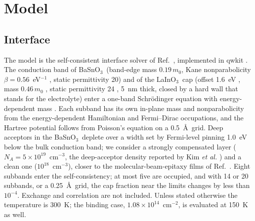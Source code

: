 \documentclass[11pt]{article}
\newcommand{\LIO}{\texorpdfstring{LaInO$_3$}{LaInO3}}
\newcommand{\BSO}{\texorpdfstring{BaSnO$_3$}{BaSnO3}}
\begin{document}
\section{Model}
\subsection{Interface}
The model is the self-consistent interface solver of Ref.~\cite{OwnbyMAT01}, implemented in qwkit \cite{qwkit}. The conduction band of \BSO\ (band-edge mass $0.19\,m_0$, Kane nonparabolicity $\beta=0.56$~eV$^{-1}$ \cite{Niedermeier2017}, static permittivity 20) and of the \LIO\ cap (offset 1.6~eV \cite{Kim2019LIO,Lee2024LIO,Aggoune2021}, mass $0.46\,m_0$ \cite{Kim2019LIO,Aggoune2021,Jang2017LIO}, static permittivity 24 \cite{Jang2017LIO,Galazka2021}, 5~nm thick, closed by a hard wall that stands for the electrolyte) enter a one-band Schr\"odinger equation with energy-dependent mass \cite{Nelson1987}. Each subband has its own in-plane mass and nonparabolicity from the energy-dependent Hamiltonian and Fermi--Dirac occupations, and the Hartree potential follows from Poisson's equation on a 0.5~\AA\ grid. Deep acceptors in the \BSO\ deplete over a width set by Fermi-level pinning 1.0~eV below the bulk conduction band; we consider a strongly compensated layer ($N_A=5\times10^{19}$~cm$^{-3}$, the deep-acceptor density reported by Kim \emph{et al.} \cite{Kim2019LIO}) and a clean one ($10^{18}$~cm$^{-3}$), closer to the molecular-beam-epitaxy films of Ref.~\cite{Lee2024LIO}. Eight subbands enter the self-consistency; at most five are occupied, and with 14 or 20 subbands, or a 0.25~\AA\ grid, the cap fraction near the limits changes by less than $10^{-4}$. Exchange and correlation are not included. Unless stated otherwise the temperature is 300~K; the binding case, $1.08\times10^{14}$~cm$^{-2}$, is evaluated at 150~K as well.
\end{document}
